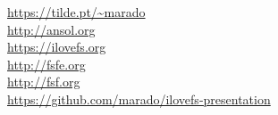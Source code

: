 \documentclass[landscape]{slides}
\begin{document}
\begin{slide}
\end{slide}

\begin{slide}
\end{slide}

\begin{slide}

\url{https://tilde.pt/~marado} \\
\url{http://ansol.org} \\
\url{https://ilovefs.org} \\
\url{http://fsfe.org} \\
\url{http://fsf.org} \\
\url{https://github.com/marado/ilovefs-presentation}
\end{slide}
\end{document}
